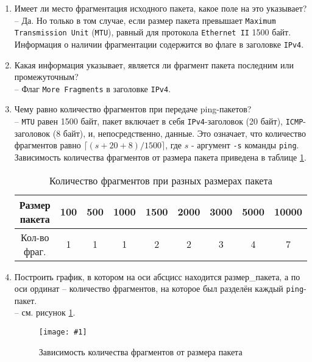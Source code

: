\documentclass[12pt, a4paper]{article}
\newcommand{\figc}[4]{
  \begin{figure}[h]
  \begin{center}
    \texttt{[image: \#1]}
    \caption{#2}
    \label{fig:#3}
  \end{center}
  \end{figure}
}
\begin{document}
\begin{enumerate}
  \item Имеет ли место фрагментация исходного пакета, какое поле на это указывает?\\
    -- Да. Но только в том случае, если размер пакета превышает \texttt{Maximum
    Transmission Unit} (\texttt{MTU}), равный для протокола \texttt{Ethernet II}
    1500 байт. Информация о наличии фрагментации содержится во флаге в заголовке
    \texttt{IPv4}.
  \item Какая информация указывает, является ли фрагмент пакета последним или
    промежуточным?\\
    -- Флаг \texttt{More Fragments} в заголовке \texttt{IPv4}.
  \item Чему равно количество фрагментов при передаче ping-пакетов?\\
    -- \texttt{MTU} равен 1500 байт, пакет включает в себя \texttt{IPv4}-заголовок
    (20 байт), \texttt{ICMP}-заголовок (8 байт), и, непосредственно, данные.
    Это означает, что количество фрагментов равно $\lceil ( s + 20 + 8 ) / 1500 \rceil$,
    где $s$ - аргумент \texttt{-s} команды \texttt{ping}. Зависимость количества
    фрагментов от размера пакета приведена в таблице \ref{Tab:frag}.

    \begin{table}[h]
    \begin{center}
    \begin{small}
      \caption{Количество фрагментов при разных размерах пакета}
      \begin{tabular}{| c | c | c | c | c | c | c | c | c |}
        \hline
        Размер пакета & 100 &	500 & 1000 & 1500 & 2000 & 3000 & 5000 & 10000\\
        \hline
        Кол-во фраг. & 1 & 1 & 1 & 2 & 2 & 3 & 4 & 7\\
        \hline
      \end{tabular}
      \label{Tab:frag}
    \end{small}
    \end{center}
    \end{table}
  \item  Построить график, в котором на оси абсцисс находится размер\_пакета,
    а по оси ординат -- количество фрагментов, на которое был разделён каждый
    \texttt{ping}-пакет.\\
    -- см. рисунок \ref{fig:frag}.
    \figc{frag}{Зависимость количества фрагментов от размера пакета}{frag}{0.8}


\end{enumerate}
\end{document}
